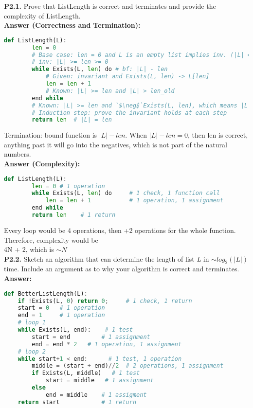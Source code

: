 \documentclass{article}
\begin{document}
\noindent
\textbf{P2.1.} Prove that ListLength is correct and terminates and provide the complexity of ListLength. \\

\noindent \textbf{Answer (Correctness and Termination): }

\begin{lstlisting}[language=Python]
    def ListLength(L):
        len = 0
        # Base case: len = 0 and L is an empty list implies inv. (|L| = len = 0)
        # inv: |L| >= len >= 0
        while Exists(L, len) do # bf: |L| - len
            # Given: invariant and Exists(L, len) -> L[len]
            len = len + 1
            # Known: |L| >= len and |L| > len_old
        end while
        # Known: |L| >= len and `$\neg$`Exists(L, len), which means |L| must be = len
        # Induction step: prove the invariant holds at each step
        return len  # |L| = len
\end{lstlisting}

\noindent Termination: bound function is $|L| - len$. When $|L| - len = 0$, then len is correct, anything past it will go into the negatives, which is not part of the natural numbers.\\

\noindent \textbf{Answer (Complexity): }

\begin{lstlisting}[language=Python]
    def ListLength(L):
        len = 0 # 1 operation   
        while Exists(L, len) do     # 1 check, 1 function call
            len = len + 1           # 1 operation, 1 assignment
        end while
        return len    # 1 return
\end{lstlisting}

\noindent Every loop would be 4 operations, then +2 operations for the whole function.
Therefore, complexity would be \\4N + 2, which is $\sim N$\\

\textbf{P2.2.} Sketch an algorithm that can determine the length of list \textit{L} in $\sim log _2
(|L|)$ time. Include an argument as to why your algorithm is correct and terminates.\\

\noindent \textbf{Answer: }

\begin{lstlisting}[language=Python]
def BetterListLength(L):
    if !Exists(L, 0) return 0;     # 1 check, 1 return
    start = 0   # 1 operation
    end = 1     # 1 operation
    # loop 1
    while Exists(L, end):    # 1 test
        start = end         # 1 assignment
        end = end * 2   # 1 operation, 1 assignment
    # loop 2
    while start+1 < end:      # 1 test, 1 operation
        middle = (start + end)//2  # 2 operations, 1 assignment
        if Exists(L, middle)   # 1 test
            start = middle   # 1 assignment
        else
            end = middle    # 1 assigment
    return start            # 1 return
        
\end{lstlisting}
\end{document}
